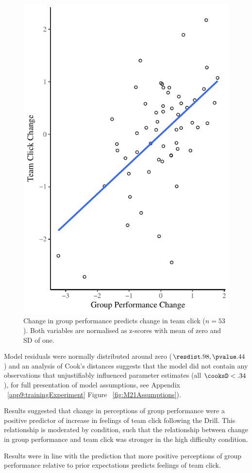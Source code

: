 \begin{figure}
     \centering
     \includegraphics[width=0.5\linewidth,keepaspectratio] {images/groupPerfClickChangeCondition}
     \caption{Change in group performance predicts change in team click ($n = 53$).  Both variables are normalised as z-scores with mean of zero and SD of one.}
     \label{fig:groupPerfClickChangeCondition}
 \end{figure}

Model residuals were normally distributed around zero ($\resdist .98, \pvalue .44$) and an analysis of Cook's distances suggests that the model did not contain any observations that unjustifiably influenced parameter estimates (all $\cooksD < .34$), for full presentation of model assumptions, see Appendix ~\ref{app9:trainingExperiment} Figure ~\ref{fig:M21Assumptions}).

Results suggested that change in perceptions of group performance were a positive predictor of increase in feelings of team click following the Drill.  This relationship is moderated by condition, such that the relationship between change in group performance and team click was stronger in the high difficulty condition.

Results were in line with the prediction that more positive perceptions of group performance relative to prior expectations predicts feelings of team click.




